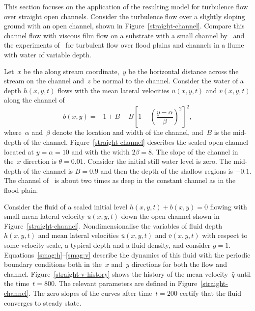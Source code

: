 \documentclass[12pt,a5paper]{article}
\newcommand{\uu}{{\bar u}}
\newcommand{\vv}{{\bar v}}
\newcommand{\bq}{{\bar q}}
\begin{document}
This section focuses on the application of the resulting model for turbulence flow over straight open channels. Consider the turbulence flow over a slightly sloping ground with an open channel, shown in Figure~\ref{straight-channel}. 
Compare this channel flow with viscous film flow on a substrate with a small channel by~\cite{Robertsli2006} and the experiments of~\cite{Bousmar2002,Bousmar2003a} for turbulent flow over flood plains and channels in a flume with water of variable depth.
 
 Let~$x$ be the along stream coordinate,~$y$ be the horizontal distance across the stream on the channel and~$z$ be normal to the channel. 
 Consider the water of a depth $h(x,y,t)$ flows with the mean lateral velocities $\bar u(x,y,t)$ and $\bar v(x,y,t)$ along the channel of
\begin{equation}
b(x,y)=-1+B-B\left[1-\left(\frac{y-\alpha}{\beta}\right)^2\right]^2,\label{bed:straight}
\end{equation}
where~$\alpha$ and~$\beta$ denote the location and width of the channel, and~$B$ is the mid-depth of the channel. 
Figure~\ref{straight-channel} describes the scaled open channel located at $y=\alpha=10$ and with the width $2\beta=8$. The slope of the channel in the~$x$ direction is $\theta=0.01$. 
Consider the initial still water level is zero. The mid-depth of the channel is $B=0.9$ and then the depth of the shallow regions is $-0.1$.
The channel of~\cite{Bousmar2002} is about two times as deep in the constant channel as in the flood plain.

Consider the fluid of a scaled initial level $h(x,y,t)+b(x,y)=0$ flowing with small mean lateral velocity $\uu(x,y,t)$ down the open channel shown in Figure~\ref{straight-channel}. 
Nondimensionalise the variables of fluid depth $h(x,y,t)$ and mean lateral velocities $\uu(x,y,t)$ and $\vv(x,y,t)$ with respect to some velocity scale, a typical depth and a fluid density, and consider $g=1$. 
Equations~\eqref{smag:h}--\eqref{smag:v} describe the dynamics of this fluid with the periodic boundary conditions both in the~$x$ and~$y$ directions for both the flow and channel. 
Figure~\ref{straight-v-history} shows the history of the mean velocity~$\bq$ until the time~$t=800$. 
The relevant parameters are defined in Figure~\ref{straight-channel}. 
The zero slopes of the curves after time~$t=200$ certify that the fluid converges to steady state. 
\end{document}
